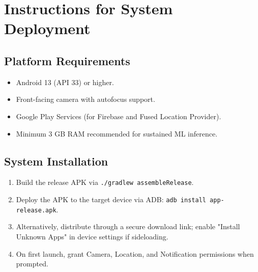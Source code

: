 \documentclass[11pt]{report}
\begin{document}
\section{Instructions for System Deployment}

\subsection{Platform Requirements}
\begin{itemize}
    \item Android 13 (API 33) or higher.
    \item Front-facing camera with autofocus support.
    \item Google Play Services (for Firebase and Fused Location Provider).
    \item Minimum 3 GB RAM recommended for sustained ML inference.
\end{itemize}

\subsection{System Installation}
\begin{enumerate}
    \item Build the release APK via \texttt{./gradlew assembleRelease}.
    \item Deploy the APK to the target device via ADB: \texttt{adb install app-release.apk}.
    \item Alternatively, distribute through a secure download link; enable "Install Unknown Apps" in device settings if sideloading.
    \item On first launch, grant Camera, Location, and Notification permissions when prompted.
\end{enumerate}

\end{document}
